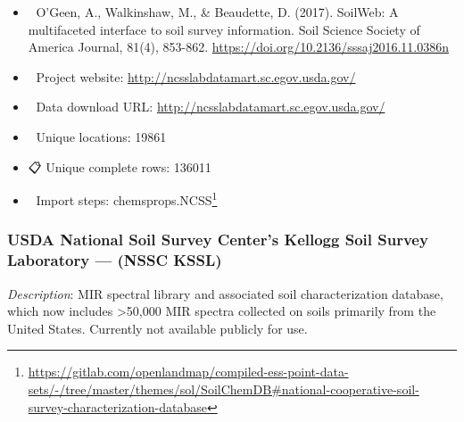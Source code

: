 \documentclass[
  graybox,natbib,nospthms]{svmono}
\providecommand{\tightlist}{%
  \setlength{\itemsep}{0pt}\setlength{\parskip}{0pt}}
\providecommand{\tightlist}{\setlength{\itemsep}{0pt}\setlength{\parskip}{0pt}}
\renewcommand{\href}[2]{#2 (\url{#1})}
\renewcommand{\href}[2]{#2\footnote{\url{#1}}}
\begin{document}
\begin{itemize}
\tightlist
\item
  📕 O'Geen, A., Walkinshaw, M., \& Beaudette, D. (2017). SoilWeb: A multifaceted interface to soil survey information. Soil Science Society of America Journal, 81(4), 853-862. \url{https://doi.org/10.2136/sssaj2016.11.0386n}\\
\item
  🔗 Project website: \url{http://ncsslabdatamart.sc.egov.usda.gov/}\\
\item
  📂 Data download URL: \url{http://ncsslabdatamart.sc.egov.usda.gov/}\\
\item
  📍 Unique locations: 19861\\
\item
  📋 Unique complete rows: 136011\\
\item
  📝 Import steps: \href{https://gitlab.com/openlandmap/compiled-ess-point-data-sets/-/tree/master/themes/sol/SoilChemDB\#national-cooperative-soil-survey-characterization-database}{chemsprops.NCSS}
\end{itemize}

\hypertarget{usda-national-soil-survey-centers-kellogg-soil-survey-laboratory-nssc-kssl}{%
\subsubsection{USDA National Soil Survey Center's Kellogg Soil Survey Laboratory --- (NSSC KSSL)}\label{usda-national-soil-survey-centers-kellogg-soil-survey-laboratory-nssc-kssl}}

\emph{Description}: MIR spectral library and associated soil characterization database, which now
includes \textgreater50,000 MIR spectra collected on soils primarily from the United States. Currently not available publicly for use.
\end{document}
